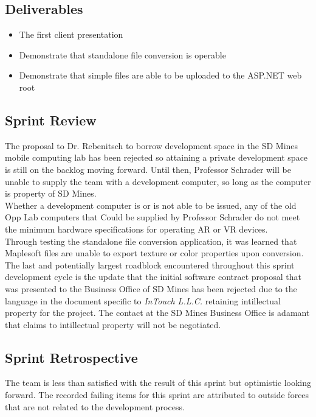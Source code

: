     \subsection{Deliverables}
    \label{sec:Sprint2_deliverables}
    \begin{itemize}
        \item The first client presentation
        \item Demonstrate that standalone file conversion is operable
        \item Demonstrate that simple files are able to be uploaded to the ASP.NET web root
    \end{itemize}

    \subsection{Sprint Review}
    \label{sec:Sprint2_review}
        \hspace{7mm}
        The proposal to Dr. Rebenitsch to borrow development space in the SD Mines mobile computing lab has
        been rejected so attaining a private development space is still on the backlog moving forward.  Until
        then, Professor Schrader will be unable to supply the team with a development computer, so long as the
        computer is property of SD Mines.\\

        Whether a development computer is or is not able to be issued, any of the old Opp Lab computers that Could
        be supplied by Professor Schrader do not meet the minimum hardware specifications for operating AR or VR
        devices.\\

        Through testing the standalone file conversion application, it was learned that Maplesoft files are unable
        to export texture or color properties upon conversion.\\

        The last and potentially largest roadblock encountered throughout this sprint development cycle is the 
        update that the initial software contract proposal that was presented to the Business Office of SD Mines
        has been rejected due to the language in the document specific to 
        \textit{InTouch L.L.C.} 
        retaining intillectual property for the project.  The contact at the SD Mines Business Office is adamant that 
        claims to intillectual property will not be negotiated.

    \subsection{Sprint Retrospective}
    \label{sec:Sprint2_retrospective}
        \hspace{7mm}
        The team is less than satisfied with the result of this sprint but optimistic looking forward.  The
        recorded failing items for this sprint are attributed to outside forces that are not related to the 
        development process.\\

